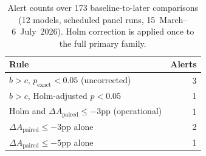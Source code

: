 \begin{table}[htbp]
    \centering
    \caption{Alert counts over 173 baseline-to-later comparisons
    (12 models, scheduled panel runs, 15~March--6~July~2026).
    Holm correction is applied once to the full primary family.}
    \label{tab:alert-counts}
    \begin{tabular}{lr}
    \toprule
    Rule & Alerts \\
    \midrule
    $b>c$, $p_{\mathrm{exact}}<0.05$ (uncorrected) & 3 \\
    $b>c$, Holm-adjusted $p<0.05$ & 1 \\
    Holm and $\Delta A_{\mathrm{paired}}\le-3$pp (operational) & 1 \\
    \midrule
    $\Delta A_{\mathrm{paired}}\le-3$pp alone & 2 \\
    $\Delta A_{\mathrm{paired}}\le-5$pp alone & 1 \\
    \bottomrule
    \end{tabular}
\end{table}
